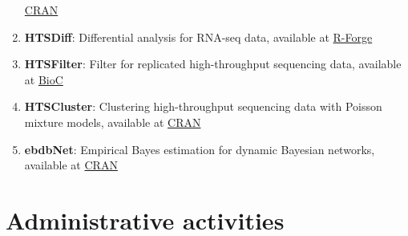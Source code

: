 \documentclass[11pt, a4paper]{awesome-cv}
\begin{document}
\begin{enumerate}
  \href{https://cran.r-project.org/web/packages/metaRNASeq/index.html}{CRAN}\\
\item
  \textbf{HTSDiff}: Differential analysis for RNA-seq data, available at
  \href{https://r-forge.r-project.org/R/?group_id=1504}{R-Forge}\\
\item
  \textbf{HTSFilter}: Filter for replicated high-throughput sequencing
  data, available at
  \href{http://www.bioconductor.org/packages/release/bioc/html/HTSFilter.html}{BioC}\\
\item
  \textbf{HTSCluster}: Clustering high-throughput sequencing data with
  Poisson mixture models, available at
  \href{http://cran.r-project.org/web/packages/HTSCluster}{CRAN}\\
\item
  \textbf{ebdbNet}: Empirical Bayes estimation for dynamic Bayesian
  networks, available at
  \href{http://cran.r-project.org/web/packages/ebdbNet}{CRAN}
\end{enumerate}

\hypertarget{administrative-activities}{%
\section{Administrative activities}\label{administrative-activities}}
\end{document}
